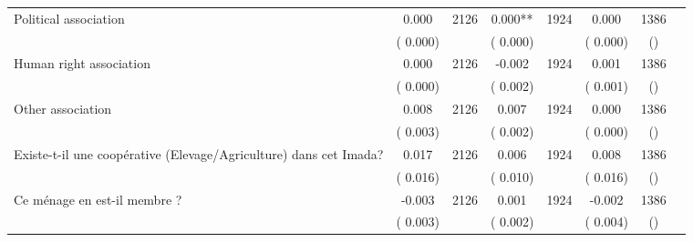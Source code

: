\begin{tabular}{l*{6}{c}}
Political association        &              0.000      &       2126       &              0.000**      &       1924       &              0.000      &       1386  &  &              \\
                       &       (       0.000)            &                               &       (       0.000)            &                               &       (       0.000)            &       () &                  \\
Human right association        &              0.000      &       2126       &             -0.002      &       1924       &              0.001      &       1386  &  &              \\
                       &       (       0.000)            &                               &       (       0.002)            &                               &       (       0.001)            &       () &                  \\
Other association        &              0.008      &       2126       &              0.007      &       1924       &              0.000      &       1386  &  &              \\
                       &       (       0.003)            &                               &       (       0.002)            &                               &       (       0.000)            &       () &                  \\
Existe-t-il une coopérative (Elevage/Agriculture) dans cet Imada?        &              0.017      &       2126       &              0.006      &       1924       &              0.008      &       1386  &  &              \\
                       &       (       0.016)            &                               &       (       0.010)            &                               &       (       0.016)            &       () &                  \\
Ce ménage en est-il membre ?        &             -0.003      &       2126       &              0.001      &       1924       &             -0.002      &       1386  &  &              \\
                       &       (       0.003)            &                               &       (       0.002)            &                               &       (       0.004)            &       () &                  \\
\hline \end{tabular}